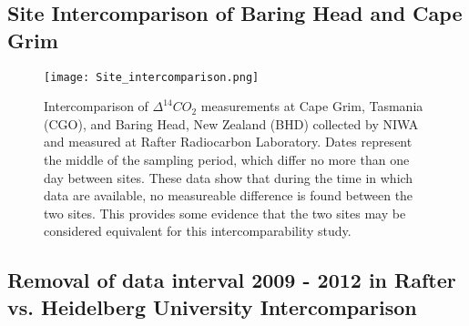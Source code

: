 \documentclass{BrJG_submit}
\begin{document}
\subsection{Site Intercomparison of Baring Head and Cape Grim}
\begin{figure}[h!]
  \caption{ Intercomparison of ${\Delta^{14}CO_{2}}$ measurements  at Cape Grim, Tasmania (CGO), and Baring Head, New Zealand (BHD) collected by NIWA and measured at Rafter Radiocarbon Laboratory. Dates represent the middle of the sampling period, which differ no more than one day between sites. These data show that during the time in which data are available, no measureable difference is found between the two sites. This provides some evidence that the two sites may be considered equivalent for this intercomparability study.}
  \texttt{[image: Site\_intercomparison.png]}
\label{fig:bhdvcgo}
\end{figure}

\subsection{Removal of data interval 2009 - 2012 in Rafter vs. Heidelberg University Intercomparison}
\end{document}
